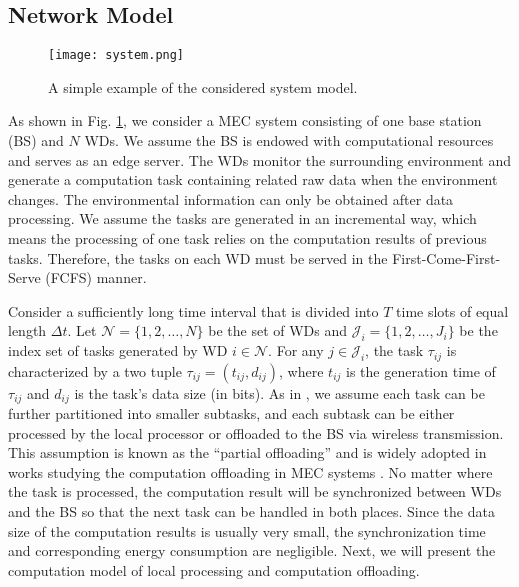 \documentclass[lettersize, journal]{IEEEtran}
\begin{document}
\subsection{Network Model}
\begin{figure}[!t]
    \centering
    \texttt{[image: system.png]}
    \caption{A simple example of the considered system model.}
    \label{fig:system}
\end{figure}
As shown in Fig. \ref{fig:system}, we consider a MEC system consisting of one base station (BS) and $N$ WDs.
We assume the BS is endowed with computational resources and serves as an edge server.
The WDs monitor the surrounding environment and 
generate a computation task containing related raw data when the environment changes.
The environmental information can only be obtained after data processing.
We assume the tasks are generated in an incremental way, which means the processing of one task relies on the computation results 
of previous tasks.
Therefore, the tasks on each WD must be served in the First-Come-First-Serve (FCFS) manner.

Consider a sufficiently long time interval that is 
divided into $T$ time slots of equal length $\Delta t$. %
Let $\mathcal{N} = \{ 1,2,\dots,N \}$ be the set of WDs and $\mathcal{J}_i = \{ 1,2,\dots,J_i \}$ be the index set of tasks generated by WD $i\in\mathcal{N}$.
For any $j\in\mathcal{J}_i$, the task $\tau_{ij}$ is characterized by a two tuple $\tau_{ij} = (t_{ij}, d_{ij})$,
where $t_{ij}$ is the generation time of $\tau_{ij}$ and $d_{ij}$ is the task's data size (in bits). 
As in \cite{song2019age}, we assume each task can be further partitioned into smaller subtasks,
and each subtask can be either processed by the local processor or offloaded to the BS via wireless transmission.
This assumption is known as the ``partial offloading'' and is widely adopted in works studying the computation offloading in MEC systems \cite{wang2017joint, kuang2019partial, wang2016mobile}.
No matter where the task is processed, the computation result will be synchronized between WDs and the BS so that the next task can be handled in both places.
Since the data size of the computation results is usually very small, the synchronization time and corresponding energy consumption are negligible.
Next, we will present the computation model of local processing and computation offloading.
\end{document}
